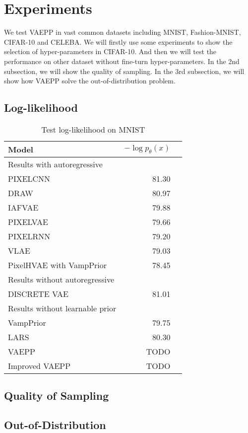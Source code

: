 \section{Experiments}
We test VAEPP in vast common datasets including MNIST, Fashion-MNIST, CIFAR-10 and CELEBA. 
We will firstly use some experiments to show the selection of hyper-parameters in CIFAR-10. And then we will test the performance on other dataset without fine-turn hyper-parameters. In the 2nd subsection, we will show the quality of sampling. In the 3rd subsection, we will show how VAEPP solve the out-of-distribution problem. 
\subsection{Log-likelihood}

\begin{table}
\centering
\begin{tabular}{lrr}  
\toprule
Model  &  $-\log p_\theta(x)$ \\
\midrule
Results with autoregressive   \\
PIXELCNN         &  81.30      \\
DRAW             &  80.97      \\
IAFVAE           &  79.88      \\
PIXELVAE         &  79.66      \\
PIXELRNN         &  79.20      \\
VLAE             &  79.03      \\
PixelHVAE with VampPrior        &  78.45      \\
\midrule
Results without autoregressive   \\
DISCRETE VAE     &  81.01      \\
\midrule
Results without learnable prior   \\
VampPrior        &  79.75      \\
LARS             &  80.30     \\
VAEPP            &  TODO      \\
Improved VAEPP   &  TODO      \\
\bottomrule
\end{tabular}
\caption{Test log-likelihood on MNIST}
\label{tab:mnist-nll}
\end{table}


\subsection{Quality of Sampling}


\subsection{Out-of-Distribution}


